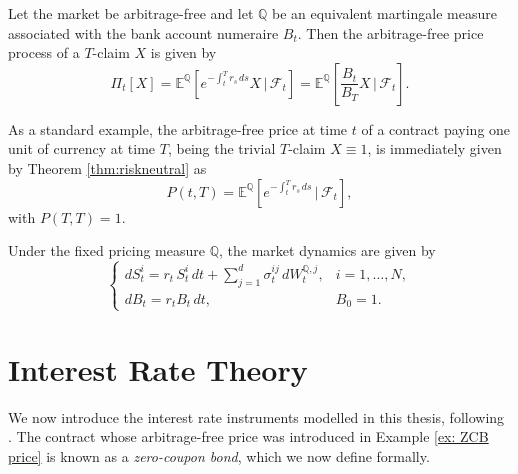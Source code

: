 
\begin{theorem}
\label{thm:riskneutral}
Let the market be arbitrage-free and let $\mathbb{Q}$ be an equivalent  martingale measure associated with the bank account numeraire $B_t$.  Then the arbitrage-free price process of a $T$-claim $X$ is given by
\begin{equation}
    \Pi_t[X] = \mathbb{E}^{\mathbb{Q}}\!\left[
    e^{-\int_t^T r_s\, ds} X \,\bigg|\, \mathcal{F}_t \right]
    = \mathbb{E}^{\mathbb{Q}}\!\left[
    \frac{B_t}{B_T} X \,\bigg|\, \mathcal{F}_t \right].
    \label{eq:riskneutral}
\end{equation}
\end{theorem}

\begin{example}
\label{ex: ZCB price}
As a standard example, the arbitrage-free price at time $t$ of a contract paying one unit of currency at time $T$, being the trivial $T$-claim $X \equiv 1$, is immediately given by
Theorem \ref{thm:riskneutral} as
\begin{equation}
    P(t,T) = \mathbb{E}^{\mathbb{Q}}\!\left[
    e^{-\int_t^T r_s\, ds} \,\bigg|\, \mathcal{F}_t \right],
    \label{eq:zcb}
\end{equation}
with $P(T,T) = 1$.    
\end{example}


Under the fixed pricing measure $\mathbb{Q}$, the market dynamics are given by
\begin{equation}
    \begin{cases}
        dS_t^i = r_t \, S_t^i \,dt + \displaystyle\sum_{j=1}^{d} 
        \sigma_t^{ij} \, dW_t^{\mathbb{Q},j}, & i = 1, \ldots, N, \\[8pt]
        dB_t = r_t B_t \, dt, & B_0 = 1. 
    \end{cases}
    \label{eq:Q_dynamics}
\end{equation}


\section{Interest Rate Theory}
\label{sec:interest_rate_theory}

We now introduce the interest rate instruments modelled in this thesis, following \citet{Filipovic2009}. The contract whose arbitrage-free price was introduced in Example \ref{ex: ZCB price} is known as a \textit{zero-coupon bond}, which we now define formally. 

